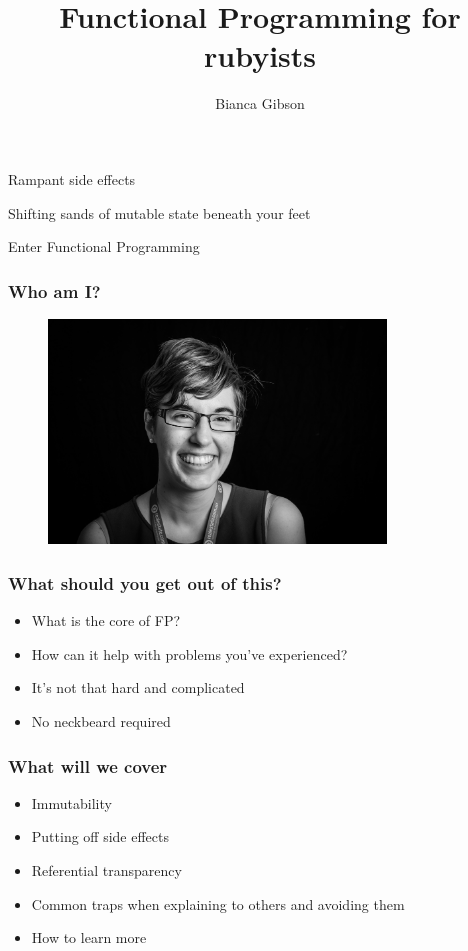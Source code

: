\documentclass{beamer}
\title{Functional Programming for rubyists}
\author{Bianca Gibson}
\institute{Ruby Conf AU 2016}
\date{}
\begin{document}
\frame{\titlepage}

\begin{frame}
\begin{center}
\Huge Rampant side effects
\end{center}
\end{frame}

\begin{frame}
\begin{center}
\Huge Shifting sands of mutable state beneath your feet
\end{center}
\end{frame}

\begin{frame}
\begin{center}
\Huge Enter Functional Programming
\end{center}
\end{frame}

\begin{frame}
\frametitle{Who am I?}
\begin{figure}[p]
  \includegraphics[width=0.8\textwidth]{./assets/portrait.jpg}
\end{figure}
\end{frame}

\begin{frame}
\frametitle{What should you get out of this?}
\begin{itemize}
  \item What is the core of FP?
  \item How can it help with problems you've experienced?
  \item It's not that hard and complicated
  \item No neckbeard required
\end{itemize}
\end{frame}

\begin{frame}
\frametitle{What will we cover}
\begin{itemize}
  \item Immutability
  \item Putting off side effects
  \item Referential transparency
  \item Common traps when explaining to others and avoiding them
  \item How to learn more
\end{itemize}
\end{frame}
\end{document}
